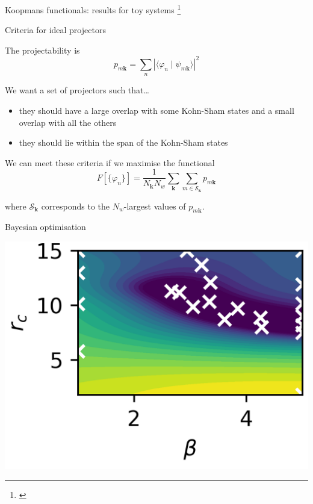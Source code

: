 \documentclass[xcolor=table,aspectratio=169]{beamer}
\newcommand\blfootcite[1]{%
  \begingroup
  \renewcommand\thefootnote{}\footnote{\hspace{-4ex}\cite{#1}}%
  \addtocounter{footnote}{-1}%
  \endgroup
}
\numberwithin{equation}{section}
\newcommand{\backupend}{
   \setcounter{framenumber}{\value{finalframe}}
}
\begin{document}
\begin{frame}{Koopmans functionals: results for toy systems}
   \blfootcite{Schubert2023}
\end{frame}

\begin{frame}{Criteria for ideal projectors}

   The projectability is
   \begin{equation*}
      p_{m\mathbf{k}} = \sum_n |\langle \varphi_n \mid \psi_{m\mathbf{k}}\rangle |^2
   \end{equation*}

   We want a set of projectors such that\dots
   \begin{itemize}
      \item they should have a large overlap with some Kohn-Sham states and a small overlap with all the others%
      \item they should lie within the span of the Kohn-Sham states%
   \end{itemize}

   We can meet these criteria if we maximise the functional
   \begin{equation*}
      F[\{\varphi_n\}] = \frac{1}{N_\mathbf{k} N_w} \sum_{\mathbf{k}} \sum_{m \in \mathcal{S}_\mathbf{k}} p_{m\mathbf{k}}
   \end{equation*}

   where $\mathcal{S}_\mathbf{k}$ corresponds to the $N_w$-largest values of $p_{m\mathbf{k}}$.

\end{frame}

\begin{frame}{Bayesian optimisation}
   \begin{center}
      \includegraphics[height=0.7\paperheight]{figures/Li_bayesian_opt.png}
   \end{center}
\end{frame}

\backupend
\end{document}
